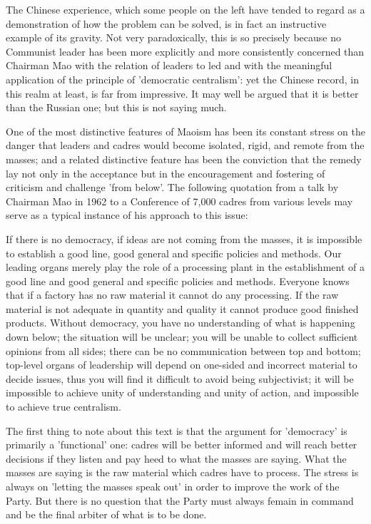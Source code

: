 The Chinese experience, which some people on the left have tended to regard as a demonstration of how the problem can be solved, is in fact an instructive example of its gravity. Not very paradoxically, this is so precisely because no Communist leader has been more explicitly and more consistently concerned than Chairman Mao with the relation of leaders to led and with the meaningful application of the principle of 'democratic centralism': yet the Chinese record, in this realm at least, is far from impressive. It may well be argued that it is better than the Russian one; but this is not saying much.

One of the most distinctive features of Maoism has been its constant stress on the danger that leaders and cadres would become isolated, rigid, and remote from the masses; and a related distinctive feature has been the conviction that the remedy lay not only in the acceptance but in the encouragement and fostering of criticism and challenge 'from below'. The following quotation from a talk by Chairman Mao in 1962 to a Conference of 7,000 cadres from various levels may serve as a typical instance of his approach to this issue:
\begin{displayquote}

    If there is no democracy, if ideas are not coming from the masses, it is impossible to establish a good line, good general and specific policies and methods. Our leading organs merely play the role of a processing plant in the establishment of a good line and good general and specific policies and methods. Everyone knows that if a factory has no raw material it cannot do any processing. If the raw material is not adequate in quantity and quality it cannot produce good finished products. Without democracy, you have no understanding of what is happening down below; the situation will be unclear; you will be unable to collect sufficient opinions from all sides; there can be no communication between top and bottom; top-level organs of leadership will depend on one-sided and incorrect material to decide issues, thus you will find it difficult to avoid being subjectivist; it will be impossible to achieve unity of understanding and unity of action, and impossible to achieve true centralism.
\end{displayquote}

The first thing to note about this text is that the argument for 'democracy' is primarily a 'functional' one: cadres will be better informed and will reach better decisions if they listen and pay heed to what the masses are saying. What the masses are saying is the raw material which cadres have to process. The stress is always on 'letting the masses speak out' in order to improve the work of the Party. But there is no question that the Party must always femain in command and be the final arbiter of what is to be done.


